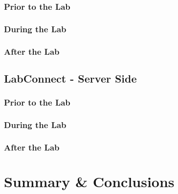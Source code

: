 \documentclass[a4paper, 12pt]{article}
\begin{document}
    \subsubsection{Prior to the Lab}
    \subsubsection{During the Lab}
    \subsubsection{After the Lab}
    
    \subsection{LabConnect - Server Side}

    \subsubsection{Prior to the Lab}
    \subsubsection{During the Lab}
    \subsubsection{After the Lab}
    
    \section{Summary \& Conclusions}
    
    \printbibliography
    
    
        
\end{document}
